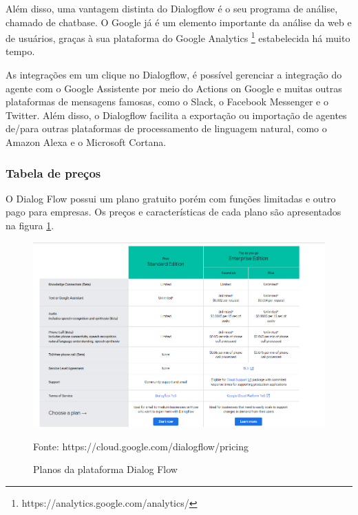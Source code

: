 Além disso, uma vantagem distinta do Dialogflow é o seu programa de análise, chamado de chatbase. O Google já é um elemento importante da análise da web e de usuários, graças à sua plataforma do Google Analytics \footnote{https://analytics.google.com/analytics/} estabelecida há muito tempo. 

 As integrações em um clique no Dialogflow, é possível gerenciar a integração do agente com o Google Assistente por meio do Actions on Google e muitas outras plataformas de mensagens famosas, como o Slack, o Facebook Messenger e o Twitter. Além disso, o Dialogflow facilita a exportação ou importação de agentes de/para outras plataformas de processamento de linguagem natural, como o Amazon Alexa e o Microsoft Cortana.


\subsubsection{Tabela de preços}

O Dialog Flow possui um plano gratuito porém com funções limitadas e outro pago para empresas. Os preços e características de cada plano são apresentados na figura \ref{fig:dialog-precos}.



\begin{figure}[H]
  \caption{Planos da plataforma Dialog Flow}

  \centering
  \includegraphics[scale=0.5]{Imagens/dialog-precos.png} 
 
  \label{fig:dialog-precos}
  
  Fonte: https://cloud.google.com/dialogflow/pricing
\end{figure}




